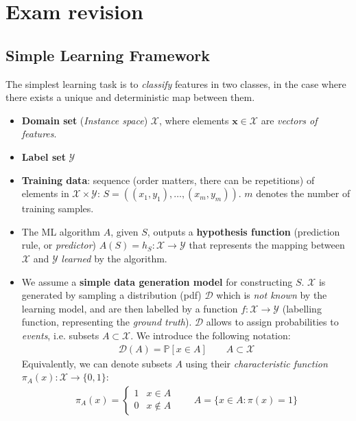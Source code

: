 \documentclass[../template.tex]{subfiles}
\begin{document}
\chapter{Exam revision}

\section{Simple Learning Framework}
The simplest learning task is to \textit{classify} features in two classes, in the case where there exists a unique and deterministic map between them. 
\begin{itemize}
    \item \textbf{Domain set} (\textit{Instance space}) $\mathcal{X}$, where elements $\bm{x} \in \mathcal{X}$ are \textit{vectors of features}.
    \item \textbf{Label set} $\mathcal{Y}$
    \item \textbf{Training data}: sequence (order matters, there can be repetitions) of elements in $\mathcal{X}\times \mathcal{Y}$: $S=((x_1 , y_1 ), \dots, (x_m, y_m))$. $m$ denotes the number of training samples.
    \item The ML algorithm $A$, given $S$, outputs a \textbf{hypothesis function} (prediction rule, or \textit{predictor}) $A(S) = h_S\colon \mathcal{X} \to \mathcal{Y}$ that represents the mapping between $\mathcal{X}$ and $\mathcal{Y}$ \textit{learned} by the algorithm.
    \item We assume a \textbf{simple data generation model} for constructing $S$. $\mathcal{X}$ is generated by sampling a distribution (pdf) $\mathcal{D}$ which is \textit{not known} by the learning model, and are then labelled by a function $f\colon \mathcal{X} \to \mathcal{Y}$ (labelling function, representing the \textit{ground truth}).  $\mathcal{D}$ allows to assign probabilities to \textit{events}, i.e. subsets $A \subset \mathcal{X}$. We introduce the following notation:
    \begin{align*}
        \mathcal{D}(A) = \mathbb{P}[x \in A] \qquad A \subset \mathcal{X}
    \end{align*} 
    Equivalently, we can denote subsets $A$ using their \textit{characteristic function} $\pi_A(x) \colon \mathcal{X} \to \{0,1\}$:
    \begin{align*}
        \pi_A(x) = \begin{cases}
            1 & x \in A\\
            0 & x \not\in A
        \end{cases} \qquad A = \{x \in A \colon \pi(x) = 1\}

\end{align*}
\end{itemize}
\end{document}
